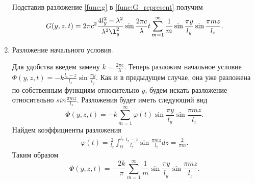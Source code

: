 \begin{enumerate}
  Подставив разложение \eqref{func:g} в \eqref{func:G_represent} получим
  \begin{equation}
    \label{func:G}
    G(y, z, t) = 2\pi c^2\frac{4l_y^2 - \lambda^2}{\lambda^2 \l_y^2} \sin\frac{2\pi c}{\lambda}t\displaystyle \sum_{m=1}^{\infty}\frac{1}{m}\sin\frac{\pi y}{l_y} \sin\frac{\pi m z}{l_z}.
  \end{equation}

\item Разложение начального условия.


  Для удобства введем замену $k = \frac{2\pi c}{\lambda}$. Теперь разложим начальное условие  $\Phi(y, z, t) = -k\frac{l_z - z}{l_z}\sin\frac{\pi y}{l_y}$. Как и в предыдущем случае, она уже разложена по собственным функциям относительно $y$, будем искать разложение относительно $sin\frac{\pi m z}{l_z}$. Разложения будет иметь следующий вид
  \[
  \Phi(y, z, t) = \displaystyle -k\sum_{m=1}^{\infty}\varphi(t) \sin\frac{\pi y}{l_y} \sin\frac{\pi m z}{l_z}.
  \]
  Найдем коэффициенты разложения
  \begin{eqnarray*}
    \varphi(t) = \displaystyle \frac{2}{l_z} \int_0^{l_z} \frac{l_z - z}{l_z}\sin\frac{\pi m z}{l_z}dz = \frac{2}{\pi m}.
  \end{eqnarray*}
  Таким образом
  \[
  \Phi(y, z, t) = -\frac{2k}{\pi}\displaystyle \sum_{m=1}^{\infty} \frac{1}{m} \sin\frac{\pi y}{l_y} \sin\frac{\pi m z}{l_z}.
  \]
\end{enumerate}

